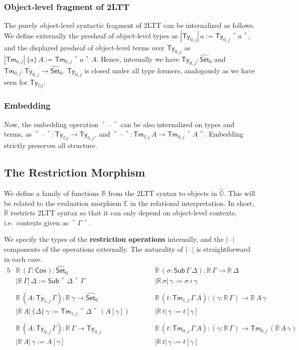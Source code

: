 \documentclass[acmsmall]{acmart}
\newcommand{\msf}[1]{\mathsf{#1}}
\newcommand{\mbb}[1]{\mathbb{#1}}
\newcommand{\wh}[1]{\widehat{#1}}
\newcommand{\mbbo}{\mbb{O}}
\newcommand{\Con}{\msf{Con}}
\newcommand{\Sub}{\msf{Sub}}
\newcommand{\Ty}{\msf{Ty}}
\newcommand{\Tm}{\msf{Tm}}
\newcommand{\Set}{\mathsf{Set}}
\newcommand{\blank}{{\mathord{\hspace{1pt}\text{--}\hspace{1pt}}}}
\newcommand{\emb}[1]{\ulcorner#1\urcorner}
\newcommand{\hato}{\bm\hat{\mbbo}}
\newcommand{\ev}{\mbb{E}}
\newcommand{\re}{\mbb{R}}
\theoremstyle{remark}
\newcommand{\whset}{\wh{\Set}}
\begin{document}
\subsubsection{Object-level fragment of 2LTT}
The purely object-level syntactic fragment of 2LTT can be internalized as
follows. We define externally the presheaf of object-level types as
$|\Ty_{0,j}|\,a := \Ty_{0,j}\,\emb{a}$, and the displayed presheaf of
object-level terms over $\Ty_{0,j}$ as $|\Tm_{0,j}|\,\{a\}\,A :=
\Tm_{0,j}\,\emb{a}\,A$. Hence, internally we have $\Ty_{0,j} : \whset_0$ and
$\Tm_{0,j} : \Ty_{0,j} \to \whset_0$. $\Ty_{0,j}$ is closed under all type formers,
analogously as we have seen for $\Ty_{\mbbo j}$.

\subsubsection{Embedding}
Now, the embedding operation $\emb{\blank}$ can be also internalized on types
and terms, as $\emb{\blank} : \Ty_{\mbbo j} \to \Ty_{0,j}$, and $\emb{\blank}
:\Tm_{\mbbo\,j}\,A \to \Tm_{0,j}\,\emb{A}$. Embedding strictly preserves all structure.

\subsection{The Restriction Morphism}

We define a family of functions $\re$ from the 2LTT syntax to objects in
$\hato$. This will be related to the evaluation morphism $\ev$ in the relational
interpretation. In short, $\re$ restricts 2LTT syntax so that it can only depend
on object-level contexts, i.e.\ contexts given as $\emb{\Gamma}$.

\begin{definition} We specify the types of the \textbf{restriction operations} internally, and the $|\blank|$
components of the operations externally. The naturality of $|\blank|$ is
straightforward in each case.
\begin{alignat*}{5}
  & \re\,(\Gamma : \Con) : \whset_0 && \re\,(\sigma : \Sub\,\Gamma\,\Delta) : \re\,\Gamma \to \re\,\Delta \\
  & |\re\,\Gamma|\,\Delta := \Sub\,\emb{\Delta}\,\Gamma && |\re\,\sigma|\,\gamma := \sigma \circ \gamma \\
  & \\
  & \re\,(A : \Ty_{1,j}\,\Gamma) : \re\,\gamma \to \whset_0 && \re\,(t : \Tm_{1,j}\,\Gamma\,A) : (\gamma : \re\,\Gamma) \to \re\,A\,\gamma \\
  & |\re\,A|\,\{\Delta\}\,\gamma := \Tm_{1,j}\,\emb{\Delta}\,(A[\gamma])\hspace{2em} && |\re\,t|\,\gamma := t[\gamma]\\
  & \\
  & \re\,(A : \Ty_{0,j}\,\Gamma) : \re\,\Gamma \to \Ty_{0,j}\hspace{2em} && \re\,(t : \Tm_{0,j}\,\Gamma\,A) : (\gamma : \re\,\Gamma) \to \Tm_{0,j}\,(\re\,A\,\gamma)\\
  & |\re\,A|\,\gamma := A[\gamma] && |\re\,t|\,\gamma := t[\gamma]
\end{alignat*}
\end{definition}
\end{document}
